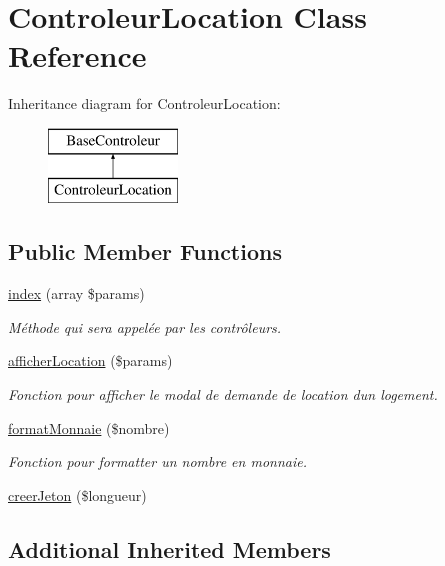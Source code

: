 \hypertarget{class_controleur_location}{}\section{Controleur\+Location Class Reference}
\label{class_controleur_location}
Inheritance diagram for Controleur\+Location\+:\begin{figure}[H]
\begin{center}
\leavevmode
\includegraphics[height=2.000000cm]{class_controleur_location}
\end{center}
\end{figure}
\subsection*{Public Member Functions}
\begin{DoxyCompactItemize}
\item 
\hyperlink{class_controleur_location_aecb1f92f10f3fc774ae8c5c4cc7a165d}{index} (array \$params)
\begin{DoxyCompactList}\small\item\em Méthode qui sera appelée par les contrôleurs. \end{DoxyCompactList}\item 
\hyperlink{class_controleur_location_a4b6693239049c3db80013b8110687690}{afficher\+Location} (\$params)
\begin{DoxyCompactList}\small\item\em Fonction pour afficher le modal de demande de location d\textquotesingle{}un logement. \end{DoxyCompactList}\item 
\hyperlink{class_controleur_location_a0db233aa6c62ab2d26496d64aa0b450c}{format\+Monnaie} (\$nombre)
\begin{DoxyCompactList}\small\item\em Fonction pour formatter un nombre en monnaie. \end{DoxyCompactList}\item 
\hyperlink{class_controleur_location_aa9739669efbe3d84d514eb7b27a78a18}{creer\+Jeton} (\$longueur)
\end{DoxyCompactItemize}
\subsection*{Additional Inherited Members}


